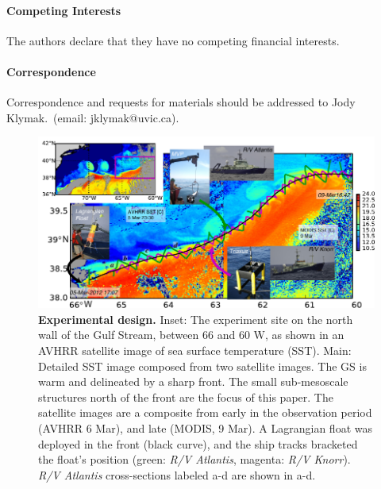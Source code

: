 \documentclass{article}
\begin{document}
\paragraph{Competing Interests} The authors declare that they have no competing financial interests.
\paragraph{Correspondence} Correspondence and requests for materials should be addressed to Jody Klymak.~(email: jklymak@uvic.ca).
\clearpage

\begin{figure}[htbp]
  \centering
    \includegraphics[width=\textwidth]{./SatOverviewSecDTry2.pdf}
   \caption{{\bf Experimental design.}  Inset: The experiment site on the north wall of the Gulf Stream, between 66 and 60 W, as shown in an AVHRR satellite image of sea surface temperature (SST).  Main:  Detailed SST image composed from two satellite images.    The GS is warm and delineated by a sharp front.  The small sub-mesoscale structures north of the front are the focus of this paper.  The satellite images are a composite from early in the observation period (AVHRR 6 Mar), and late (MODIS, 9 Mar).  A Lagrangian float was deployed in the front (black curve), and the ship tracks bracketed the float's position (green: \emph{R/V Atlantis}, magenta: \emph{R/V Knorr}). \emph{R/V Atlantis} cross-sections labeled a-d are shown in a-d.  }\label{fig:SatOverviewSectD}
\end{figure}
\end{document}
